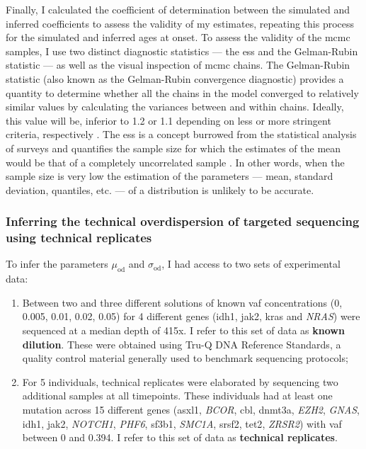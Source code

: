 Finally, I calculated the coefficient of determination between the simulated and inferred coefficients to assess the validity of my estimates, repeating this process for the simulated and inferred ages at onset. To assess the validity of the \ac{mcmc} samples, I use two distinct diagnostic statistics --- the \ac{ess} and the Gelman-Rubin statistic \cite{Gelman1992-zo} --- as well as the visual inspection of \ac{mcmc} chains. The Gelman-Rubin statistic (also known as the Gelman-Rubin convergence diagnostic) provides a quantity to determine whether all the chains in the model converged to relatively similar values by calculating the variances between and within chains. Ideally, this value will be, inferior to 1.2 or 1.1 depending on less or more stringent criteria, respectively \cite{Brooks1998-jx}. The \ac{ess} is a concept burrowed from the statistical analysis of surveys and quantifies the sample size for which the estimates of the mean would be that of a completely uncorrelated sample \cite{Kish1965-ei}. In other words, when the sample size is very low the estimation of the parameters --- mean, standard deviation, quantiles, etc. --- of a distribution is unlikely to be accurate.

\subsubsection{Inferring the technical overdispersion of targeted sequencing using technical replicates}

To infer the parameters $\mu_{\mathrm{od}}$ and $\sigma_{\mathrm{od}}$, I had access to two sets of experimental data:

\begin{enumerate}
	\item Between two and three different solutions of known \ac{vaf} concentrations (0, 0.005, 0.01, 0.02, 0.05) for 4 different genes (\ac{idh1}, \ac{jak2}, \ac{kras} and \textit{NRAS}) were sequenced at a median depth of 415x. I refer to this set of data as \textbf{known dilution}. These were obtained using Tru-Q DNA Reference Standards, a quality control material generally used to benchmark sequencing protocols;
	
	\item For 5 individuals, technical replicates were elaborated by sequencing two additional samples at all timepoints. These individuals had at least one mutation across 15 different genes (\ac{asxl1}, \textit{BCOR}, \ac{cbl}, \ac{dnmt3a}, \textit{EZH2}, \textit{GNAS}, \ac{idh1}, \ac{jak2}, \textit{NOTCH1}, \textit{PHF6}, \ac{sf3b1}, \textit{SMC1A}, \ac{srsf2}, \ac{tet2}, \textit{ZRSR2}) with \ac{vaf} between 0 and 0.394. I refer to this set of data as \textbf{technical replicates}.
\end{enumerate}

